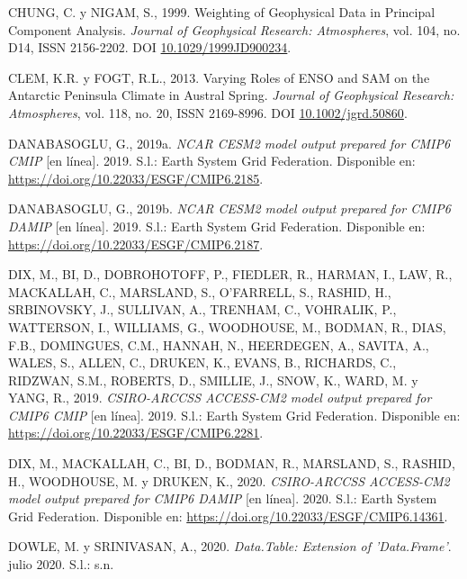 \documentclass[12pt,oneside,a4paper]{reedthesis}
\newlength{\cslhangindent}
\newenvironment{CSLReferences}[2] %
 {%
  \setlength{\parindent}{0pt}
  \ifodd #1 \everypar{\setlength{\hangindent}{\cslhangindent}}\ignorespaces\fi
  \ifnum #2 > 0
  \setlength{\parskip}{#2\baselineskip}
  \fi
 }%
 {}
\begin{document}
\begin{CSLReferences}{1}{0}
\leavevmode{}%
CHUNG, C. y NIGAM, S., 1999. Weighting of Geophysical Data in {Principal Component Analysis}. \emph{Journal of Geophysical Research: Atmospheres}, vol. 104, no. D14, ISSN 2156-2202. DOI \href{https://doi.org/10.1029/1999JD900234}{10.1029/1999JD900234}.

\leavevmode{}%
CLEM, K.R. y FOGT, R.L., 2013. Varying Roles of {ENSO} and {SAM} on the {Antarctic Peninsula} Climate in Austral Spring. \emph{Journal of Geophysical Research: Atmospheres}, vol. 118, no. 20, ISSN 2169-8996. DOI \href{https://doi.org/10.1002/jgrd.50860}{10.1002/jgrd.50860}.

\leavevmode{}%
DANABASOGLU, G., 2019a. \emph{NCAR CESM2 model output prepared for CMIP6 CMIP} {[}en línea{]}. 2019. S.l.: Earth System Grid Federation. Disponible en: \url{https://doi.org/10.22033/ESGF/CMIP6.2185}.

\leavevmode{}%
DANABASOGLU, G., 2019b. \emph{NCAR CESM2 model output prepared for CMIP6 DAMIP} {[}en línea{]}. 2019. S.l.: Earth System Grid Federation. Disponible en: \url{https://doi.org/10.22033/ESGF/CMIP6.2187}.

\leavevmode{}%
DIX, M., BI, D., DOBROHOTOFF, P., FIEDLER, R., HARMAN, I., LAW, R., MACKALLAH, C., MARSLAND, S., O'FARRELL, S., RASHID, H., SRBINOVSKY, J., SULLIVAN, A., TRENHAM, C., VOHRALIK, P., WATTERSON, I., WILLIAMS, G., WOODHOUSE, M., BODMAN, R., DIAS, F.B., DOMINGUES, C.M., HANNAH, N., HEERDEGEN, A., SAVITA, A., WALES, S., ALLEN, C., DRUKEN, K., EVANS, B., RICHARDS, C., RIDZWAN, S.M., ROBERTS, D., SMILLIE, J., SNOW, K., WARD, M. y YANG, R., 2019. \emph{CSIRO-ARCCSS ACCESS-CM2 model output prepared for CMIP6 CMIP} {[}en línea{]}. 2019. S.l.: Earth System Grid Federation. Disponible en: \url{https://doi.org/10.22033/ESGF/CMIP6.2281}.

\leavevmode{}%
DIX, M., MACKALLAH, C., BI, D., BODMAN, R., MARSLAND, S., RASHID, H., WOODHOUSE, M. y DRUKEN, K., 2020. \emph{CSIRO-ARCCSS ACCESS-CM2 model output prepared for CMIP6 DAMIP} {[}en línea{]}. 2020. S.l.: Earth System Grid Federation. Disponible en: \url{https://doi.org/10.22033/ESGF/CMIP6.14361}.

\leavevmode{}%
DOWLE, M. y SRINIVASAN, A., 2020. \emph{Data.Table: {Extension} of 'Data.Frame'}. julio 2020. S.l.: s.n.


\end{CSLReferences}
\end{document}
